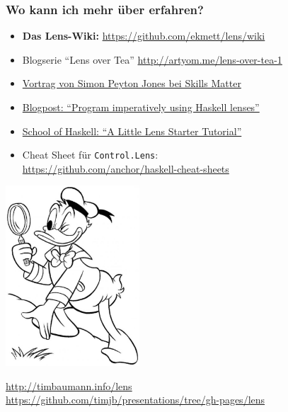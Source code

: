 \documentclass{beamer}
\begin{document}
\begin{frame}[fragile,t]
  \frametitle{Wo kann ich mehr über  erfahren?}
  \begin{itemize}
    \item \textbf{Das Lens-Wiki:} \url{https://github.com/ekmett/lens/wiki}
    \item Blogserie ``Lens over Tea'' \url{http://artyom.me/lens-over-tea-1}
    \item \href{https://skillsmatter.com/skillscasts/4251-lenses-compositional-data-access-and-manipulation}{Vortrag von Simon Peyton Jones bei Skills Matter}
    \item \href{http://www.haskellforall.com/2013/05/program-imperatively-using-haskell.html}{Blogpost: ``Program imperatively using Haskell lenses''}
    \item \href{https://www.fpcomplete.com/school/to-infinity-and-beyond/pick-of-the-week/a-little-lens-starter-tutorial}{School of Haskell: ``A Little Lens Starter Tutorial''}
    \item Cheat Sheet für \verb|Control.Lens|: \\
    \url{https://github.com/anchor/haskell-cheat-sheets}
  \end{itemize}
\end{frame}

{
\begin{frame}[b]
  \begin{center}
    \includegraphics[width=5cm,keepaspectratio]{images/donald-detective.jpg} \\
  \end{center}

  \centering \small
  \url{http://timbaumann.info/lens} \\
  \url{https://github.com/timjb/presentations/tree/gh-pages/lens}
\end{frame}}
\end{document}
